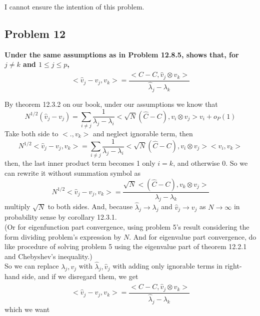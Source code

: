 \documentclass{article}
\begin{document}
I cannot ensure the intention of this problem.


\subsection{Problem 12}
\textbf{
Under the same assumptions as in Problem 12.8.5,
shows that, for $j\neq k$ and $1\leq j \leq p$,
\[<\hat{v}_j-v_j, v_k>=\frac{<\hat{C}-C,\hat{v}_j \otimes v_k>}{\hat{\lambda}_j-\lambda_k}\]
}

By theorem 12.3.2 on our book, under our assumptions we know that 
\[N^{1/2}(\hat{v}_j-v_j)=\sum_{i\neq j}\frac{1}{\lambda_j-\lambda_i}<\sqrt{N}(\hat{C}-C), v_i\otimes v_j>v_i+o_P(1)\]
Take both side to $<., v_k>$ and neglect ignorable term, then
\[N^{1/2}<\hat{v}_j-v_j,v_k>=\sum_{i\neq j}\frac{1}{\lambda_j-\lambda_i}<\sqrt{N}(\hat{C}-C), v_i\otimes v_j><v_i,v_k>\]
then, the last inner product term becomes 1 only $i=k$, and otherwise 0. So we can rewrite it without summation symbol as 
\[N^{1/2}<\hat{v}_j-v_j,v_k>=\frac{\sqrt{N}<(\hat{C}-C), v_k\otimes v_j>}{\lambda_j-\lambda_k}\]
multiply $\sqrt{N}$ to both sides.
And, because $\hat{\lambda}_j\rightarrow\lambda_j$ and $\hat{v}_j\rightarrow v_j$ as $N\rightarrow \infty$
in probability sense by corollary 12.3.1.\\
(Or for eigenfunction part convergence, using problem 5's result considering the form dividing problem's expression by $N$. 
And for eigenvalue part convergence, do like procedure of solving problem 5 using the eigenvalue part of theorem 12.2.1 and Chebyshev's inequality.)\\ 
So we can replace $\lambda_j, v_j$ with $\hat{\lambda}_j,\hat{v}_j$ with adding only ignorable terms in right-hand side,
and if we disregard them, we get
\[<\hat{v}_j-v_j, v_k>=\frac{<\hat{C}-C,\hat{v}_j \otimes v_k>}{\hat{\lambda}_j-\lambda_k}\]
which we want
\end{document}
